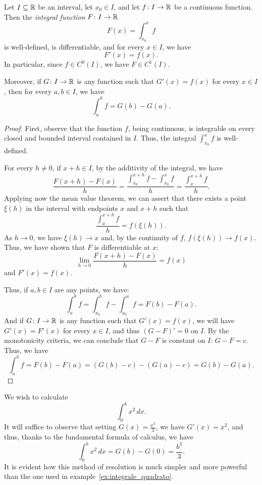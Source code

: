 \begin{theorem}
\mymark{***}%
%
%
%
\label{th:torricelli-barrow}%
Let $I\subseteq {\mathbb R}$ be an interval, let $x_0 \in I$,
 and let $f\colon I\to {\mathbb R}$ be a continuous function.
Then the \emph{integral function}
$F\colon I \to {\mathbb R}$
\[
  F(x) = \int_{x_0}^x f
\]
is well-defined, is differentiable, and for every $x\in I$, we have
\[
  F'(x) = f(x).
\]
In particular, since $f\in C^0(I)$, we have $F\in C^1(I)$.

Moreover, if $G\colon I \to {\mathbb R}$ is any function such that
$G'(x) = f(x)$ for every $x\in I$, then for every $a,b \in I$, we have
%
\[
  \int_a^b f = G(b) - G(a).
\]
\end{theorem}
%
\begin{proof}
\mymark{***}
First, observe that the function $f$, being continuous, is integrable
on every closed and bounded interval contained in $I$. Thus, the integral
$\int_{x_0}^x f$ is well-defined.

For every $h\neq 0$, if $x+h \in I$, by the additivity of the integral,
we have
\[
\frac{F(x+h) - F(x)}{h} = \frac{\int_{x_0}^{x+h} f - \int_{x_0}^x f}{h}
 = \frac{\int_x^{x+h} f}{h}.
\]
Applying now the mean value theorem, we can
assert that there exists a point $\xi(h)$ in the interval with endpoints $x$ and
$x+h$
such that
\[
  \frac{\int_x^{x+h} f}{h} = f(\xi(h)).
\]
As $h\to 0$, we have $\xi(h) \to x$ and, by the continuity of $f$,
$f(\xi(h)) \to f(x)$.
Thus, we have shown that $F$ is differentiable at $x$:
\[
 \lim_{h\to 0}\frac{F(x+h)-F(x)}{h} = f(x)
\]
and $F'(x) = f(x)$.

Thus, if $a,b\in I$ are any points, we have:
\[
\int_a^b f = \int_{x_0}^b f - \int_{x_0}^a f = F(b) - F(a).
\]
And if $G\colon I \to {\mathbb R}$ is any function such that $G'(x)=f(x)$, we
will have $G'(x) = F'(x)$ for every $x\in I$, and thus $(G-F)' = 0$ on $I$.
By the monotonicity criteria, we can conclude that $G-F$ is constant on $I$:
$G-F = c$. Thus, we have
\[
 \int_a^b f = F(b) - F(a) = (G(b) - c) - (G(a) - c) = G(b) - G(a).
\]
\end{proof}

\begin{example}
We wish to calculate
\[
  \int_0^b x^2\, dx.
\]
It will suffice to observe that setting $G(x)=\frac{x^3}{3}$, we have
$G'(x)=x^2$,
and thus, thanks to the fundamental formula of calculus, we have
\[
  \int_0^b x^2\, dx = G(b) - G(0) = \frac{b^3}{3}.
\]
It is evident how this method of resolution is much simpler
and more powerful than the one used in example~\ref{ex:integrale_quadrato}.
\end{example}

